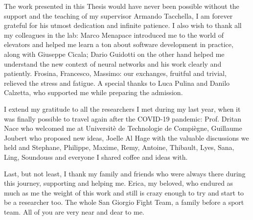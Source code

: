 
\begin{acknowledgements}      
%
The work presented in this Thesis would have never been possible without
the support and the teaching of my supervisor Armando Tacchella, I am
forever grateful for his utmost dedication and infinite patience. I also wish
to thank all my colleagues in the lab: Marco Menapace introduced me to the world
of elevators and helped me learn a ton about software development in practice, 
along with Giuseppe Cicala; Dario Guidotti on the other hand helped me 
understand the new context of neural networks and his work clearly and patiently.
Frosina, Francesco, Massimo: our exchanges, fruitful and trivial, relieved 
the stress and fatigue. A special thanks to Luca Pulina and Danilo Calzetta, 
who supported me while preparing the admission.

I extend my gratitude to all the researchers I met during my last year, when
it was finally possible to travel again after the COVID-19 pandemic: Prof. Dritan
Nace who welcomed me at Universitè de Technologie de Compiègne, Guillaume Joubert
who proposed new ideas, Joelle Al Hage with the valuable discussions we held and
Stephane, Philippe, Maxime, Remy, Antoine, Thibault, Lyes, Sana, Ling, Soundouss 
and everyone I shared coffee and ideas with.

Last, but not least, I thank my family and friends who were always there during
this journey, supporting and helping me. Erica, my beloved, who endured as much as
me the weight of this work and still is crazy enough to try and start to be a 
researcher too. The whole San Giorgio Fight Team, a family before a sport team.
All of you are very near and dear to me.
%
\end{acknowledgements}
